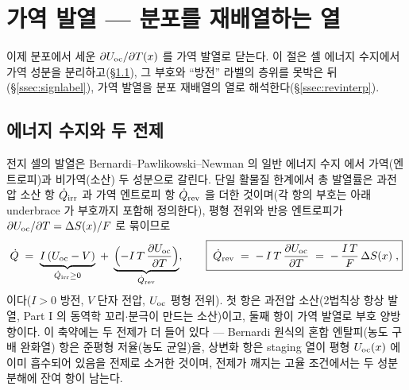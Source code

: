 \section{가역 발열 --- 분포를 재배열하는 열}\label{sec:revheat}

이제 분포에서 세운 $\partial U_{\mathrm{oc}}/\partial T(x)$ 를 가역 발열로 닫는다. 이 절은 셀 에너지 수지에서 가역 성분을
분리하고(\S\ref{ssec:balance}), 그 부호와 ``방전'' 라벨의 층위를 못박은 뒤(\S\ref{ssec:signlabel}), 가역 발열을
분포 재배열의 열로 해석한다(\S\ref{ssec:revinterp}).

\subsection{에너지 수지와 두 전제}\label{ssec:balance}
전지 셀의 발열은 Bernardi--Pawlikowski--Newman 의 일반 에너지 수지 \cite{bernardi1985} 에서 가역(엔트로피)과
비가역(소산) 두 성분으로 갈린다. 단일 활물질 한계에서 총 발열률은 과전압 소산 항 $\dot Q_{\mathrm{irr}}$ 과 가역
엔트로피 항 $\dot Q_{\mathrm{rev}}$ 을 더한 것이며(각 항의 부호는 아래 underbrace 가 부호까지 포함해 정의한다),
평형 전위와 반응 엔트로피가 $\partial U_{\mathrm{oc}}/\partial T=\Delta S(x)/F$ 로 묶이므로
\begin{equation}
\dot Q \;=\; \underbrace{I\,(U_{\mathrm{oc}}-V)}_{\dot Q_{\mathrm{irr}}\ge0}\;+\;\underbrace{\Bigl(-I\,T\,\frac{\partial U_{\mathrm{oc}}}{\partial T}\Bigr)}_{\dot Q_{\mathrm{rev}}},
\qquad
\boxed{\;\dot Q_{\mathrm{rev}} \;=\; -\,I\,T\,\frac{\partial U_{\mathrm{oc}}}{\partial T}\;=\;-\,\frac{I\,T}{F}\,\Delta S(x)\;,}
\label{eq:qrev}
\end{equation}
이다($I>0$ 방전, $V$ 단자 전압, $U_{\mathrm{oc}}$ 평형 전위). 첫 항은 과전압 소산(2법칙상 항상 발열, Part I 의
동역학 꼬리$\cdot$분극이 만드는 소산)이고, 둘째 항이 가역 발열로 부호 양방향이다. 이 축약에는 두 전제가 더
들어 있다 --- Bernardi 원식의 혼합 엔탈피(농도 구배 완화열) 항은 준평형 저율(농도 균일)을, 상변화 항은
staging 열이 평형 $U_{\mathrm{oc}}(x)$ 에 이미 흡수되어 있음을 전제로 소거한 것이며, 전제가 깨지는 고율 조건에서는 두
성분 분해에 잔여 항이 남는다.

